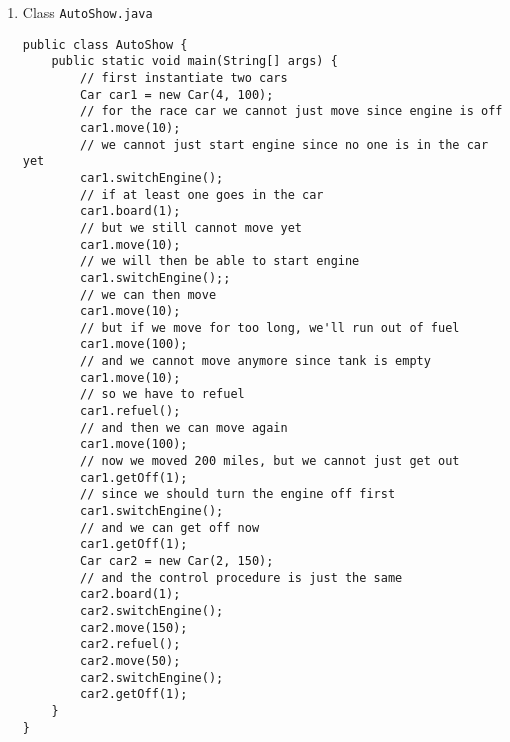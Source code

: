 \begin{enumerate}[label=(\alph*)]
\item Class \texttt{AutoShow.java}
\lstset{language=java, tabsize=2}
\begin{lstlisting}
public class AutoShow {
	public static void main(String[] args) {
		// first instantiate two cars
		Car car1 = new Car(4, 100);
		// for the race car we cannot just move since engine is off
		car1.move(10);
		// we cannot just start engine since no one is in the car yet
		car1.switchEngine();
		// if at least one goes in the car
		car1.board(1);
		// but we still cannot move yet
		car1.move(10);
		// we will then be able to start engine
		car1.switchEngine();;
		// we can then move
		car1.move(10);
		// but if we move for too long, we'll run out of fuel
		car1.move(100);
		// and we cannot move anymore since tank is empty
		car1.move(10);
		// so we have to refuel
		car1.refuel();
		// and then we can move again
		car1.move(100);
		// now we moved 200 miles, but we cannot just get out
		car1.getOff(1);
		// since we should turn the engine off first
		car1.switchEngine();
		// and we can get off now
		car1.getOff(1);
		Car car2 = new Car(2, 150);
		// and the control procedure is just the same
		car2.board(1);
		car2.switchEngine();
		car2.move(150);
		car2.refuel();
		car2.move(50);
		car2.switchEngine();
		car2.getOff(1);
	}
}
\end{lstlisting}

\end{enumerate}